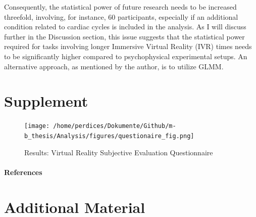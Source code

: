 \documentclass[12pt,oneside,openright]{report}
\begin{document}
Consequently, the statistical power of future research needs to be increased threefold, involving, for instance, 60 participants, especially if an additional condition related to cardiac cycles is included in the analysis. As I will discuss further in the Discussion section, this issue suggests that the statistical power required for tasks involving longer Immersive Virtual Reality (IVR) times needs to be significantly higher compared to psychophysical experimental setups. An alternative approach, as mentioned by the author, is to utilize GLMM.



\newpage
\section*{Supplement}
    \begin{figure}[H]
        \centering
        \texttt{[image: /home/perdices/Dokumente/Github/m-b\_thesis/Analysis/figures/questionaire\_fig.png]}
        \caption{Results: Virtual Reality Subjective Evaluation Questionnaire}
        \label{fig:quest}
    \end{figure}
\pagebreak



\paragraph{\textbf{References}}
\printbibliography[heading=none]


\pagebreak
\vspace*{\fill}
\section*{\centering Additional Material}
\vspace*{\fill}
\end{document}
